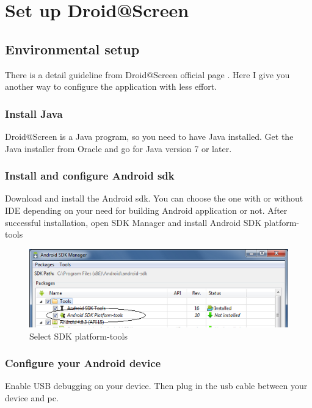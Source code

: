 \chapter{Set up Droid@Screen}
\label{ch:droid_setup}
\section{Environmental setup}
There is a detail guideline from Droid@Screen official page \cite{droid_setup}. Here I give you another way to configure the application with less effort.

\subsection{Install Java}
Droid@Screen is a Java program, so you need to have Java installed. Get the Java installer from Oracle and go for Java version 7 or later.

\subsection{Install and configure Android \acrshort{sdk}}
Download and install the Android \acrfull{sdk}. You can choose the one with or without IDE depending on your need for building Android application or not.
\newline
After successful installation, open SDK Manager and install Android SDK platform-tools
    
    \begin{figure}[H]
		\centering
		\includegraphics[scale=0.75]{Chapters/Fig/sdk_mng.png}
		\caption{Select SDK platform-tools}
		\label{fig:sdk_mng}
	\end{figure}

\subsection{Configure your Android device}
Enable USB debugging on your device. Then plug in the \acrshort{usb} cable between your device and \acrshort{pc}.
    
